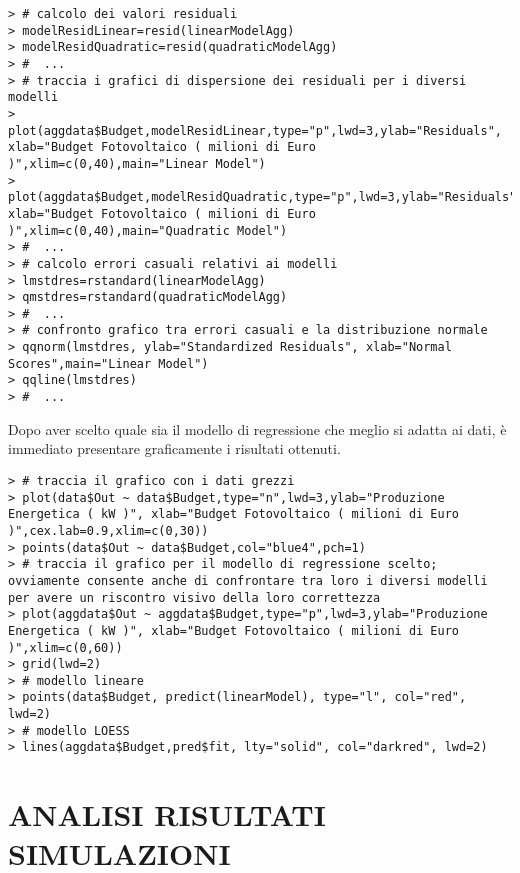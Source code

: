 \documentclass[12pt,a4paper,openright,twoside]{report}
\begin{document}
\begin{lstlisting}
> # calcolo dei valori residuali
> modelResidLinear=resid(linearModelAgg)
> modelResidQuadratic=resid(quadraticModelAgg)
> #  ...
> # traccia i grafici di dispersione dei residuali per i diversi modelli
> plot(aggdata$Budget,modelResidLinear,type="p",lwd=3,ylab="Residuals", xlab="Budget Fotovoltaico ( milioni di Euro )",xlim=c(0,40),main="Linear Model") 
> plot(aggdata$Budget,modelResidQuadratic,type="p",lwd=3,ylab="Residuals", xlab="Budget Fotovoltaico ( milioni di Euro )",xlim=c(0,40),main="Quadratic Model") 
> #  ...
> # calcolo errori casuali relativi ai modelli
> lmstdres=rstandard(linearModelAgg)
> qmstdres=rstandard(quadraticModelAgg)
> #  ...
> # confronto grafico tra errori casuali e la distribuzione normale
> qqnorm(lmstdres, ylab="Standardized Residuals", xlab="Normal Scores",main="Linear Model") 
> qqline(lmstdres)
> #  ...
\end{lstlisting}

Dopo aver scelto quale sia il modello di regressione che meglio si adatta ai dati, è immediato presentare graficamente i risultati ottenuti.

\begin{lstlisting}
> # traccia il grafico con i dati grezzi
> plot(data$Out ~ data$Budget,type="n",lwd=3,ylab="Produzione Energetica ( kW )", xlab="Budget Fotovoltaico ( milioni di Euro )",cex.lab=0.9,xlim=c(0,30))
> points(data$Out ~ data$Budget,col="blue4",pch=1)
> # traccia il grafico per il modello di regressione scelto; ovviamente consente anche di confrontare tra loro i diversi modelli per avere un riscontro visivo della loro correttezza
> plot(aggdata$Out ~ aggdata$Budget,type="p",lwd=3,ylab="Produzione Energetica ( kW )", xlab="Budget Fotovoltaico ( milioni di Euro )",xlim=c(0,60)) 
> grid(lwd=2)
> # modello lineare
> points(data$Budget, predict(linearModel), type="l", col="red", lwd=2)
> # modello LOESS
> lines(aggdata$Budget,pred$fit, lty="solid", col="darkred", lwd=2)
\end{lstlisting}

\section[ANALISI RISULTATI]{ANALISI RISULTATI SIMULAZIONI}
\end{document}
